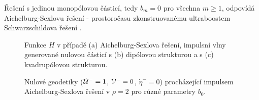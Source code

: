 Řešení s jedinou monopólovou částicí, tedy $b_m=0$ pro všechna $m \geq 1$, odpovídá Aichelburg-Sexlovu řešení - prostoročasu
zkonstruovanému ultraboostem Schwarzschildova řešení \cite{Aichelburg_1971}.

\begin{figure}[h]
    \centering
    \begin{subfigure}[b]{0.31\textwidth}
       \caption{}
    \end{subfigure}
     \hfill
     \begin{subfigure}[b]{0.31\textwidth}
       \caption{}
     \end{subfigure}
     \hfill
     \begin{subfigure}[b]{0.31\textwidth}
       \caption{}
     \end{subfigure}

    \caption{Funkce $H$ v případě (a) Aichelburg-Sexlova řešení, impulsní vlny generované nulovou částicí s (b) dipólovou strukturou a s (c) kvadrupólovou strukturou.}
\end{figure}

\begin{figure}[h]
    \centering
     \caption{Nulové geodetiky ($\dot {\mathcal{U}}^-=1$, $\dot {\mathcal{V}}^-=0$, $\dot \eta^-=0$) procházející impulsem
     Aichelburg-Sexlova řešení v $\rho=2$ pro různé parametry $b_0$.}
     \label{fig:Null_UV_AichelburgSexl_parameters}
\end{figure}

